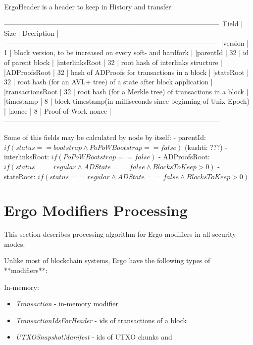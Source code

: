 \documentclass[]{report}   %
\begin{document}
ErgoHeader is a header to keep in History and transfer: 


---------------------------------------------------------------------------------------------
|Field            |  Size | Decription                                                      |
---------------------------------------------------------------------------------------------
|version          |  1    | block version, to be increased on every soft- and hardfork      |
|parentId         |  32   | id of parent block                                              |
|interlinksRoot   |  32   | root hash of interlinks structure                               |
|ADProofsRoot     |  32   | hash of ADProofs for transactions in a block                    |
|stateRoot        |  32   | root hash (for an AVL+ tree) of a state after block application |
|transactionsRoot |  32   | root hash (for a Merkle tree) of transactions in a block        |
|timestamp        |  8    | block timestamp(in milliseconds since beginning of Unix Epoch)  |
|nonce            |  8    | Proof-of-Work nonce                                             |
---------------------------------------------------------------------------------------------


Some of this fields may be calculated by node by itself:
- parentId: $if(status==bootstrap \land PoPoWBootstrap == false)$ (kushti: ???)
- interlinksRoot: $if(PoPoWBootstrap == false)$
- ADProofsRoot: $if(status==regular \land ADState==false \land BlocksToKeep>0)$ 
- stateRoot: $if(status==regular \land ADState==false \land BlocksToKeep>0)$ 

\section{Ergo Modifiers Processing}

This section describes processing algorithm for Ergo modifiers in all security modes.

Unlike most of blockchain systems, Ergo have the following types of **modifiers**:

In-memory:
\begin{itemize}
  \item{\em Transaction} - in-memory modifier
  \item{\em TransactionIdsForHeader} - ids of transactions of a block
  \item{\em UTXOSnapshotManifest} - ids of UTXO chunks and 
\end{itemize}
\end{document}
